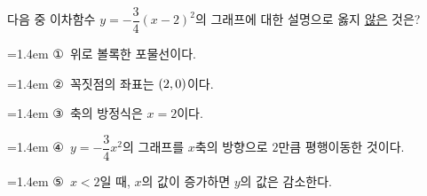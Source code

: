 다음 중 이차함수 $y=-\dfrac{3}{4}(x-2)^2$의 그래프에 대한 설명으로 옳지 \underline{않은} 것은?
\par\medskip\par\noindent\hangindent=1.4em {\small ①}\ 위로 볼록한 포물선이다.\par\noindent\hangindent=1.4em {\small ②}\ 꼭짓점의 좌표는 $(2{,}\mkern3mu\mathopen{}0)$이다.\par\noindent\hangindent=1.4em {\small ③}\ 축의 방정식은 $x=2$이다.\par\noindent\hangindent=1.4em {\small ④}\ $y=-\dfrac{3}{4}x^2$의 그래프를 $x$축의 방향으로 $2$만큼 평행이동한 것이다.\par\noindent\hangindent=1.4em {\small ⑤}\ $x<2$일 때, $x$의 값이 증가하면 $y$의 값은 감소한다.\par\medskip
